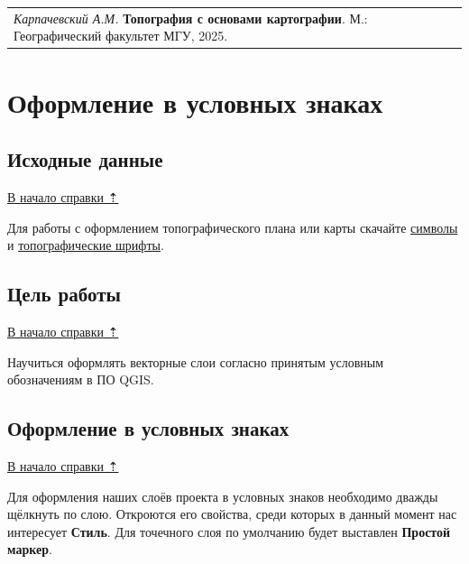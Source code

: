 \documentclass[
  12pt,
]{book}
\begin{document}
\begin{longtable}[]{@{}l@{}}
\toprule\noalign{}
\endhead
\bottomrule\noalign{}
\endlastfoot
\emph{Карпачевский А.М.} \textbf{Топография с основами картографии}. М.: Географический факультет МГУ, 2025. \\
\end{longtable}

\chapter{Оформление в условных знаках}\label{symbols}

\section{Исходные данные}\label{symbols-initial}

\hyperref[symbols]{В начало справки ⇡}

Для работы с оформлением топографического плана или карты скачайте \href{https://yadi.sk/d/mb1wTvAUUAgVUQ}{символы} и \href{https://yadi.sk/d/G_3EVFLqg3C5pA}{топографические шрифты}.

\section{Цель работы}\label{symbols-task}

\hyperref[symbols]{В начало справки ⇡}

Научиться оформлять векторные слои согласно принятым условным обозначениям в ПО QGIS.

\section{Оформление в условных знаках}\label{symbols-symbols}

\hyperref[symbols]{В начало справки ⇡}

Для оформления наших слоёв проекта в условных знаков необходимо дважды щёлкнуть по слою. Откроются его свойства, среди которых в данный момент нас интересует \textbf{Стиль}. Для точечного слоя по умолчанию будет выставлен \textbf{Простой маркер}.
\end{document}
